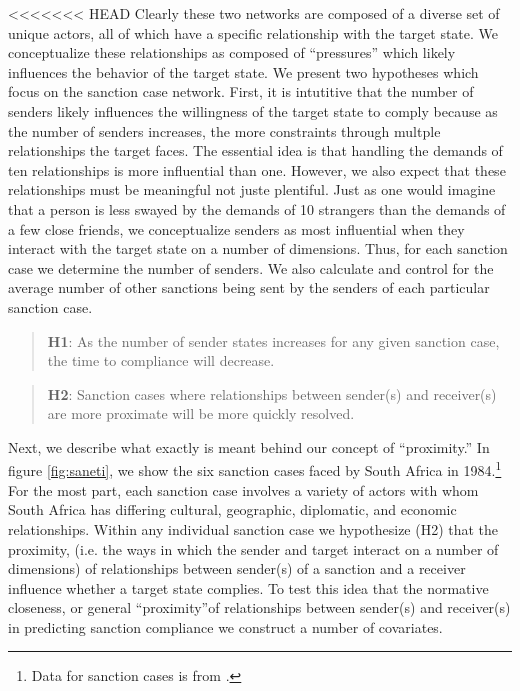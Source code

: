 <<<<<<< HEAD
Clearly these two networks are composed of a diverse set of unique actors, all of which have a specific relationship with the target state. We conceptualize these relationships as composed of ``pressures'' which likely influences the behavior of the target state. We present two hypotheses which focus on the sanction case network. First, it is intutitive that the number of senders likely influences the willingness of the target state to comply because as the number of senders increases, the more constraints through multple relationships the target faces. The essential idea is that handling the demands of ten relationships is more influential than one. However, we also expect that these relationships must be meaningful not juste plentiful. Just as one would imagine that a person is less swayed by the demands of 10 strangers than the demands of a few close friends, we conceptualize senders as most influential when they interact with the target state on a number of dimensions.  Thus, for each sanction case we determine the number of senders. We also calculate and control for the average number of other sanctions being sent by the senders of each particular sanction case.

\begin{quote}
	\textbf{H1}: As the number of sender states increases for any given sanction case, the time to compliance will decrease. 
\end{quote}

\begin{quote}
	\textbf{H2}: Sanction cases where relationships between sender(s) and receiver(s) are more proximate will be more quickly resolved.
\end{quote}

 Next, we describe what exactly is meant behind our concept of ``proximity.'' In figure \ref{fig:saneti}, we show the six sanction cases faced by South Africa in 1984.\footnote{Data for sanction cases is from \citet{morgan2009threat}.} For the most part, each sanction case involves a variety of actors with whom South Africa has differing cultural, geographic, diplomatic, and economic relationships. Within any individual sanction case we hypothesize (H2) that the proximity, (i.e. the ways in which the sender and target interact on a number of dimensions) of relationships between sender(s) of a sanction and a receiver influence whether a target state complies. To test this idea that the normative closeness, or general ``proximity''of relationships between sender(s) and receiver(s) in predicting sanction compliance we construct a number of covariates. 

